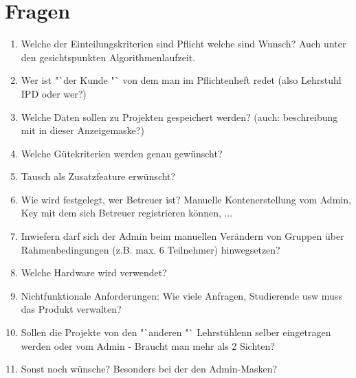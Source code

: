 \documentclass[parskip=full]{scrartcl}
\begin{document}
\section{Fragen}
\begin{enumerate}
  \item Welche der Einteilungskriterien sind Pflicht welche sind Wunsch? Auch
  unter den gesichtspunkten Algorithmenlaufzeit.
  \item Wer ist "`der Kunde "` von dem man im Pflichtenheft redet (also
  Lehrstuhl IPD oder wer?)
  \item Welche Daten sollen zu Projekten gespeichert werden? (auch: beschreibung
  mit in dieser Anzeigemaske?)
  
  \item Welche Gütekriterien werden genau gewünscht?
  \item Tausch als Zusatzfeature erwünscht?
  \item Wie wird festgelegt, wer Betreuer ist? Manuelle Kontenerstellung vom Admin, Key mit dem sich Betreuer registrieren können, ...
  \item Inwiefern darf sich der Admin beim manuellen Verändern von Gruppen über Rahmenbedingungen (z.B. max. 6 Teilnehmer) hinwegsetzen?
  \item Welche Hardware wird verwendet?
  
  \item Nichtfunktionale Anforderungen: Wie viele Anfragen, Studierende usw muss
  das Produkt verwalten?
  \item Sollen die Projekte von den "`anderen "` Lehrstühlenn selber eingetragen
  werden oder vom Admin - Braucht man mehr als 2 Sichten?
  
  
  \item Sonst noch wünsche? Besonders bei der den Admin-Masken?
\end{enumerate}
\end{document}
